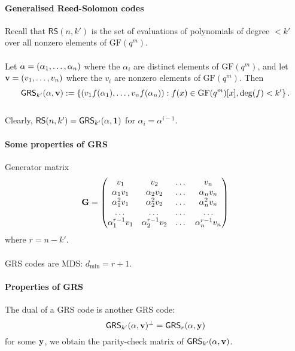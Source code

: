 \documentclass[a4paper, 11pt, openany]{book}
\numberwithin{equation}{section}
\theoremstyle{plain}
\theoremstyle{definition}
\newcommand{\GF}{\mathrm{GF}}
\newcommand{\dmin}{d_{\min}}
\newcommand{\code}[1]{\mathsf{#1}}
\newcommand{\ReedSolomon}           {\code{RS}}
\newcommand{\GeneralizedReedSolomon}{\code{GRS}}
\begin{document}
\paragraph{Generalised Reed-Solomon codes}
Recall that $\ReedSolomon(n,k')$ is the set of evaluations of polynomials of degree $< k'$ over all nonzero elements of $\GF(q^m)$.\\
~\\
Let ${\bf \alpha} = (\alpha_1, \dots, \alpha_n)$ where the $\alpha_i$ are distinct elements of $\GF(q^m)$, and let ${\bf v} = (v_1, \dots, v_n)$ where the $v_i$ are nonzero elements of $\GF(q^m)$. Then
\[
	\GeneralizedReedSolomon_{k'} ({\bf \alpha}, {\bf v}) := \left\{ \left( v_1 f(\alpha_1), \dots, v_n f(\alpha_n) \right) : f(x) \in \GF(q^m)[x], \deg(f) < k' \right\}.
\]
~\\
Clearly, $\ReedSolomon(n,k') = \GeneralizedReedSolomon_{k'}({\bf \alpha}, {\bf 1})$ for $\alpha_i = \alpha^{i-1}$.


\paragraph{Some properties of GRS}
Generator matrix
\[
	{\bf G} = \begin{pmatrix}
		v_1 & v_2 & \dots & v_n\\
		\alpha_1 v_1 & \alpha_2 v_2 & \dots &\alpha_n v_n\\
		\alpha_1^2 v_1 & \alpha_2^2 v_2 & \dots  & \alpha_n^2 v_n\\
		\dots & \dots & \dots & \dots\\
		\alpha_1^{r-1} v_1  & \alpha_2^{r-1} v_2 & \dots & \alpha_n^{r-1} v_n
	\end{pmatrix}
\]
where $r = n - k'$.\\
~\\
GRS codes are MDS: $\dmin = r + 1$.


\paragraph{Properties of GRS}
The dual of a GRS code is another GRS code:
\[
	\GeneralizedReedSolomon_{k'}( {\bf \alpha}, {\bf v} )^\perp = \GeneralizedReedSolomon_r( {\bf \alpha}, {\bf y} )
\]
for some ${\bf y}$, we obtain the parity-check matrix of $\GeneralizedReedSolomon_{k'}( {\bf \alpha}, {\bf v} )$.
\end{document}
